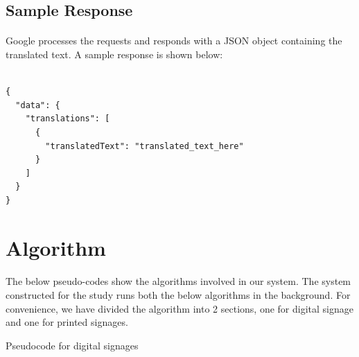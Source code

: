 \documentclass[12pt]{article}
\makeatletter
\def\BState{\State\hskip-\ALG@thistlm}
\makeatother
\begin{document}
\subsection{Sample Response}

\paragraph{} Google processes the requests and responds with a JSON object containing the translated text. A sample response is shown below:

\begin{lstlisting}

{
  "data": {
    "translations": [
      {
        "translatedText": "translated_text_here"
      }
    ]
  }
}
\end{lstlisting}



\section{Algorithm}

\paragraph{}The below pseudo-codes show the algorithms involved in our system. The system constructed for the study runs both the below algorithms in the background. For convenience, we have divided the algorithm into 2 sections, one for digital signage and one for printed signages. 

\begin{algorithm}
\caption{Pseudocode for digital signages}\label{euclid}
\end{algorithm}
\end{document}
